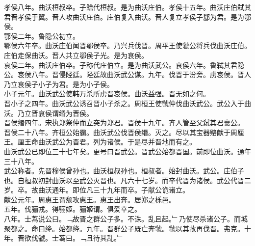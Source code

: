 \documentclass{zhvt-classic}
\begin{document}
\hspace*{2em}孝侯八年。曲沃桓叔卒。子鳝代桓叔。是为曲沃庄伯。孝侯十五年。曲沃庄伯弑其君晋孝侯于翼。晋人攻曲沃庄伯。庄伯复入曲沃。晋人复立孝侯子郄为君。是为鄂侯。\\
\hspace*{2em}鄂侯二年。鲁隐公初立。\\
\hspace*{2em}鄂侯六年卒。曲沃庄伯闻晋鄂侯卒。乃兴兵伐晋。周平王使虢公将兵伐曲沃庄伯。庄伯走保曲沃。晋人共立鄂侯子光。是为哀侯。\\
\hspace*{2em}哀侯二年。曲沃庄伯卒。子称代庄伯立。是为曲沃武公。哀侯六年。鲁弑其君隐公。哀侯八年。晋侵陉廷。陉廷故曲沃武公谋。九年。伐晋于汾旁。虏哀侯。晋人乃立哀侯子小子为君。是为小子侯。\\
\hspace*{2em}小子元年。曲沃武公使韩万杀所虏晋哀侯。曲沃益强。晋无如之何。\\
\hspace*{2em}晋小子之四年。曲沃武公诱召晋小子杀之。周桓王使虢仲伐曲沃武公。武公入于曲沃。乃立晋哀侯谓缗为晋侯。\\
\hspace*{2em}晋侯缗四年。宋执郑祭仲而立突为郑君。晋侯十九年。齐人管至父弑其君襄公。\\
\hspace*{2em}晋侯二十八年。齐桓公始霸。曲沃武公伐晋侯缗。灭之。尽以其宝器赂献于周厘王。厘王命曲沃武公为晋君。列为诸侯。于是尽并晋地而有之。\\
\hspace*{2em}曲沃武公已即位三十七年矣。更号曰晋武公。晋武公始都晋国。前即位曲沃。通年三十八年。\\
\hspace*{2em}武公称者。先晋穆侯曾孙也。曲沃桓叔孙也。桓叔者。始封曲沃。武公。庄伯子也。自桓叔初封曲沃以至武公灭晋也。凡六十七岁。而卒代晋为诸侯。武公代晋二岁。卒。故曲沃通年。即位凡三十九年而卒。子献公诡诸立。\\
\hspace*{2em}献公元年。周惠王谓颓攻惠王。惠王出奔。居郑之栎邑。\\
\hspace*{2em}五年。伐骊戎。得骊姬。骊姬谓。俱爱幸之。\\
\hspace*{2em}八年。士蒍说公曰。﹁故晋之群公子多。不诛。乱且起。﹂乃使尽杀诸公子。而城聚都之。命曰绛。始都绛。九年。晋群公子既亡奔虢。虢以其故再伐晋。弗克。十年。晋欲伐虢。士蒍曰。﹁且待其乱。﹂\\
\end{document}
